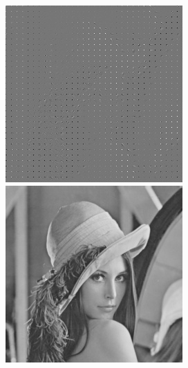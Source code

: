 \begin{figure}[ht]
	\centering
	\begin{minipage}[c]{0.45\linewidth}
		\centering
	 	\includegraphics[width=\textwidth]{DCT_lena.jpg}
	\end{minipage}
	\begin{minipage}[c]{0.45\linewidth}
		\centering
	 	\includegraphics[width=\textwidth]{lena.jpg}

\end{minipage}
\end{figure}
